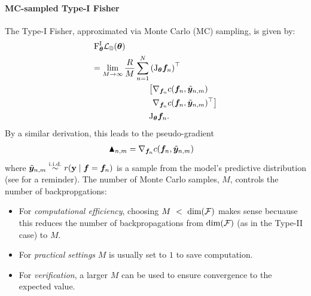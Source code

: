 \paragraph{MC-sampled Type-I Fisher}
The Type-I Fisher, approximated via Monte Carlo (MC) sampling, is given by:
\begin{align*}
&\mathrm{F}^{\text{I}}_{{\bm{\theta}}}{\mathcal{L}}_{{\mathbb{D}}}({\bm{\theta}}) \\
&\begin{aligned}
= \lim_{M \to \infty} \frac{R}{M} \sum_{n=1}^N
  &\left( \mathrm{J}_{{\bm{\theta}}} {\bm{f}}_n\right)^{\top} \\
  &
\begin{aligned}
  \big[ 
  &\nabla_{{\bm{f}}_n} c({\bm{f}}_n, \tilde{{\bm{y}}}_{n,m}) \\
  &\nabla_{{\bm{f}}_n} c({\bm{f}}_n, \tilde{{\bm{y}}}_{n,m})^{\top}
  \big] 
\end{aligned} \\
  &\mathrm{J}_{{\bm{\theta}}} {\bm{f}}_n.
\end{aligned}
\end{align*}
By a similar derivation, this leads to the pseudo-gradient
\begin{align*}
  \blacktriangle_{n,m}
  &= \nabla_{{\bm{f}}_n}  c({\bm{f}}_n, \tilde{{\bm{y}}}_{n,m})
\end{align*}
where $\tilde{\vy}_{n,m} \stackrel{\text{\iid}}{\sim} r(\rvy \mid \vf = \vf_n)$ is a sample from the model's predictive distribution (see  for a reminder).
The number of Monte Carlo samples, $M$, controls the number of backpropgations:
\begin{itemize}
 \item For \emph{computational efficiency}, choosing $M~<~\dim({\mathcal{F}})$ makes sense becuause this reduces the number of backpropagations from $\dim({\mathcal{F}})$ (as in the Type-II case) to $M$.
 \item For \emph{practical settings} $M$ is usually set to $1$ to save computation.
 \item For \emph{verification}, a larger $M$ can be used to ensure convergence to the expected value.
\end{itemize}

